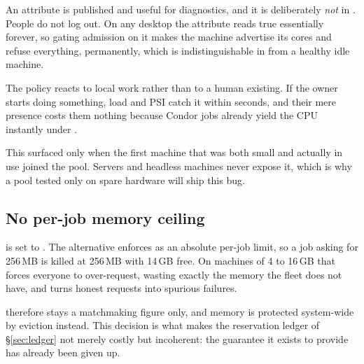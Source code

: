 An  attribute is published and useful for diagnostics,
and it is deliberately \emph{not} in . People do not log out. On any
desktop the attribute reads true essentially forever, so gating admission on it
makes the machine advertise its cores and refuse everything, permanently, which
is indistinguishable in  from a healthy idle machine.

The policy reacts to local work rather than to a human existing. If the owner
starts doing something, load and PSI catch it within seconds, and their mere
presence costs them nothing because Condor jobs already yield the CPU instantly
under .

This surfaced only when the first machine that was both small and actually in
use joined the pool. Servers and headless machines never expose it, which is
why a pool tested only on spare hardware will ship this bug.

\subsection{No per-job memory ceiling}

 is set to . The alternative enforces
 as an absolute per-job limit, so a job asking for 256\,MB is
killed at 256\,MB with 14\,GB free. On machines of 4 to 16\,GB that forces
everyone to over-request, wasting exactly the memory the fleet does not have,
and turns honest requests into spurious failures.

 therefore stays a matchmaking figure only, and memory is
protected system-wide by eviction instead. This decision is what makes the
reservation ledger of \S\ref{sec:ledger} not merely costly but incoherent: the
guarantee it exists to provide has already been given up.
